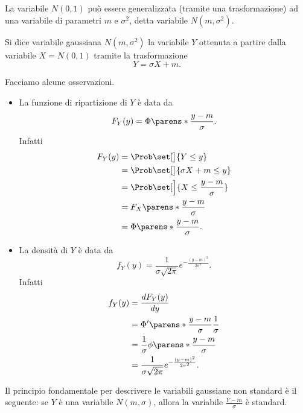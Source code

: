 La variabile $N(0, 1)$ può essere generalizzata (tramite una trasformazione) ad una variabile di parametri $m$ e $\sigma^2$, detta variabile $N(m, \sigma^2)$.

\begin{definition}
     Si dice variabile gaussiana $N(m, \sigma^2)$ la variabile $Y$ ottenuta a partire dalla variabile $X = N(0, 1)$ tramite la trasformazione \[
        Y = \sigma X + m.     
    \]
\end{definition}

Facciamo alcune osservazioni. \begin{itemize}
    \item La funzione di ripartizione di $Y$ è data da \[
        F_Y(y) = \Phi\parens*{\frac{y-m}{\sigma}}.    
    \] Infatti \begin{align*}
        F_Y(y) &= \Prob\set[\big]{Y \leq y} \\
        &= \Prob\set[\big]{\sigma X + m \leq y}\\
        &= \Prob\set[\Big]{X \leq \frac{y-m}{\sigma}}\\
        &= F_X\parens*{\frac{y-m}{\sigma}}\\
        &= \Phi\parens*{\frac{y-m}{\sigma}}.
    \end{align*}
    \item La densità di $Y$ è data da \[
        f_Y(y) = \frac{1}{\sigma\sqrt{2\pi}} e^{-\frac{(y-m)^2}{2\sigma^2}}.
    \] Infatti \begin{align*}
        f_Y(y) &= \frac{dF_Y(y)}{dy}\\
        &= \Phi^\prime\parens*{\frac{y-m}{\sigma}}\frac{1}{\sigma}\\
        &= \frac{1}{\sigma}\phi\parens*{\frac{y-m}{\sigma}}\\
        &= \frac{1}{\sigma\sqrt{2\pi}} e^{-\frac{(y-m)^2}{2\sigma^2}}.
    \end{align*}
\end{itemize}

Il principio fondamentale per descrivere le variabili gaussiane non standard è il seguente: se $Y$ è una variabile $N(m, \sigma)$, allora la variabile $\frac{Y-m}{\sigma}$ è standard.

